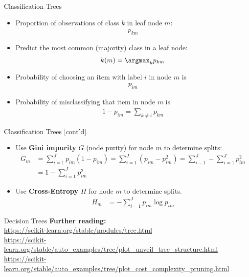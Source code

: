 \documentclass[ignorenonframetext,xcolor=x11names]{beamer}
\begin{document}
\begin{frame}{Classification Trees}
\begin{itemize}

   \item Proportion of observations of class $k$ in leaf node $m$:
   \begin{align*}p_{km}\end{align*}
   \item Predict the most common (majority) class in a leaf node: 
   \begin{align*}k(m) = \argmax_k p_{km}\end{align*}
   \item Probability of choosing an item with label $i$ in node $m$ is
   \begin{align*}p_{im}\end{align*}
   \item Probability of misclassifying that item in node $m$ is 
   \begin{align*}1 - p_{im} = \sum_{k \neq i} p_{km}\end{align*}
   
\end{itemize}
\end{frame}

\begin{frame}{Classification Trees \small [cont'd]}
\begin{itemize}
   \item Use \textbf{Gini impurity} $G$ (node purity) for node $m$ to determine splits:
   \begin{align*}
   G_m &= \sum_{i=1}^J p_{im}(1-p_{im}) = \sum_{i=1}^J (p_{im} - p_{im}^2) = \sum_{i-1}^J - \sum_{i=1}^J p_{im}^2 \\
     &= 1 - \sum_{i=1}^J p_{im}^2
   \end{align*} 
   
   \item Use \textbf{Cross-Entropy} $H$ for node $m$ to determine splits.
   \begin{align*}
   H_m &= - \sum_{i=1}^J p_{im} \log p_{im} 
   \end{align*}
   
\end{itemize}
\end{frame}

\begin{frame}{Decision Trees}
\textbf{Further reading:} \\

\small
\url{https://scikit-learn.org/stable/modules/tree.html} \\

\url{https://scikit-learn.org/stable/auto_examples/tree/plot_unveil_tree_structure.html} \\

\url{https://scikit-learn.org/stable/auto_examples/tree/plot_cost_complexity_pruning.html}
\end{frame}
\end{document}
